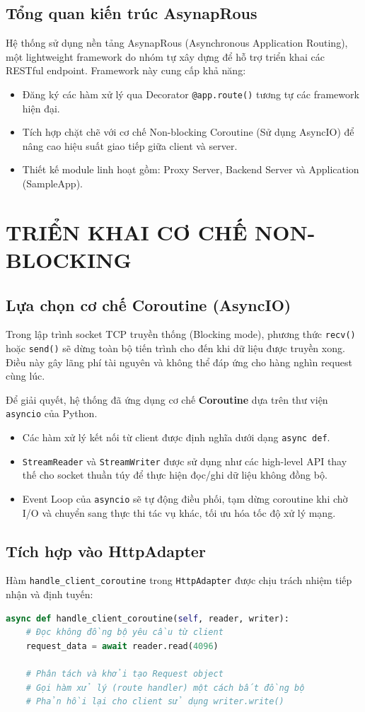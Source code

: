 \documentclass[a4paper,12pt]{article}
\begin{document}
\subsection{Tổng quan kiến trúc AsynapRous}
Hệ thống sử dụng nền tảng AsynapRous (Asynchronous Application Routing), một lightweight framework do nhóm tự xây dựng để hỗ trợ triển khai các RESTful endpoint. Framework này cung cấp khả năng:
\begin{itemize}
    \item Đăng ký các hàm xử lý qua Decorator \texttt{@app.route()} tương tự các framework hiện đại.
    \item Tích hợp chặt chẽ với cơ chế Non-blocking Coroutine (Sử dụng AsyncIO) để nâng cao hiệu suất giao tiếp giữa client và server.
    \item Thiết kế module linh hoạt gồm: Proxy Server, Backend Server và Application (SampleApp).
\end{itemize}

\newpage
\section{TRIỂN KHAI CƠ CHẾ NON-BLOCKING}

\subsection{Lựa chọn cơ chế Coroutine (AsyncIO)}
Trong lập trình socket TCP truyền thống (Blocking mode), phương thức \texttt{recv()} hoặc \texttt{send()} sẽ dừng toàn bộ tiến trình cho đến khi dữ liệu được truyền xong. Điều này gây lãng phí tài nguyên và không thể đáp ứng cho hàng nghìn request cùng lúc.

Để giải quyết, hệ thống đã ứng dụng cơ chế \textbf{Coroutine} dựa trên thư viện \texttt{asyncio} của Python.
\begin{itemize}
    \item Các hàm xử lý kết nối từ client được định nghĩa dưới dạng \texttt{async def}.
    \item \texttt{StreamReader} và \texttt{StreamWriter} được sử dụng như các high-level API thay thế cho socket thuần túy để thực hiện đọc/ghi dữ liệu không đồng bộ.
    \item Event Loop của \texttt{asyncio} sẽ tự động điều phối, tạm dừng coroutine khi chờ I/O và chuyển sang thực thi tác vụ khác, tối ưu hóa tốc độ xử lý mạng.
\end{itemize}

\subsection{Tích hợp vào HttpAdapter}
Hàm \texttt{handle\_client\_coroutine} trong \texttt{HttpAdapter} được chịu trách nhiệm tiếp nhận và định tuyến:
\begin{lstlisting}[language=Python]
async def handle_client_coroutine(self, reader, writer):
    # Đọc không đồng bộ yêu cầu từ client
    request_data = await reader.read(4096)
    
    # Phân tách và khởi tạo Request object
    # Gọi hàm xử lý (route handler) một cách bất đồng bộ
    # Phản hồi lại cho client sử dụng writer.write()
\end{lstlisting}
\end{document}
